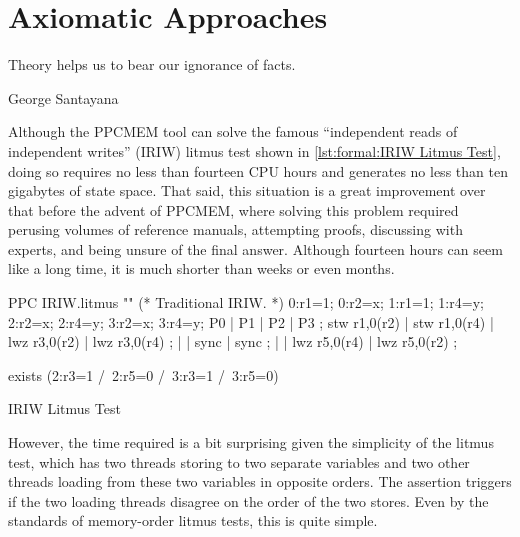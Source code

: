
\section{Axiomatic Approaches}
\label{sec:formal:Axiomatic Approaches}
%
\epigraph{Theory helps us to bear our ignorance of facts.}
	{George Santayana}

Although the PPCMEM tool can solve the famous ``independent reads of
independent writes'' (IRIW) litmus test shown in
\cref{lst:formal:IRIW Litmus Test}, doing so requires no less than
fourteen CPU hours and generates no less than ten gigabytes of state space.
That said, this situation is a great improvement over that before the advent
of PPCMEM, where solving this problem required perusing volumes of
reference manuals, attempting proofs, discussing with experts, and
being unsure of the final answer.
Although fourteen hours can seem like a long time, it is much shorter
than weeks or even months.

\begin{listing}
\begin{fcvlabel}
\begin{VerbatimL}[commandchars=\%\@\$]
PPC IRIW.litmus
""
(* Traditional IRIW. *)
{
0:r1=1; 0:r2=x;
1:r1=1;         1:r4=y;
        2:r2=x; 2:r4=y;
        3:r2=x; 3:r4=y;
}
P0           | P1           | P2           | P3           ;
stw r1,0(r2) | stw r1,0(r4) | lwz r3,0(r2) | lwz r3,0(r4) ;
             |              | sync         | sync         ;
             |              | lwz r5,0(r4) | lwz r5,0(r2) ;

exists
(2:r3=1 /\ 2:r5=0 /\ 3:r3=1 /\ 3:r5=0)
\end{VerbatimL}
\end{fcvlabel}
\caption{IRIW Litmus Test}
\label{lst:formal:IRIW Litmus Test}
\end{listing}

However, the time required is a bit surprising given the simplicity
of the litmus test, which has two threads storing to two separate variables
and two other threads loading from these two variables in opposite
orders.
The assertion triggers if the two loading threads disagree on the order
of the two stores.
Even by the standards of memory-order litmus tests, this is quite simple.

